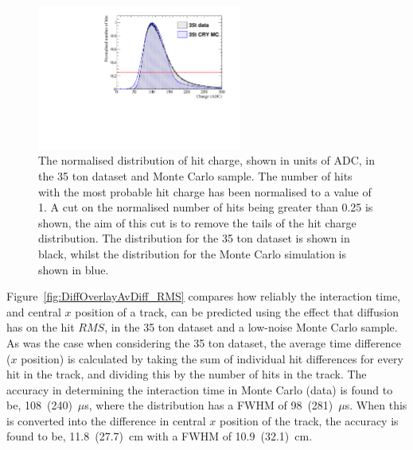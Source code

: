 \begin{figure}
  \centering
  \includegraphics[width=0.6\textwidth]{ChargeCutOverlay}
  \caption[The normalised distribution of hit charge in the 35 ton dataset and a Monte Carlo sample]
          {The normalised distribution of hit charge, shown in units of ADC, in the 35 ton dataset and Monte Carlo sample. The number of hits with the most probable hit charge has been normalised to a value of 1. A cut on the normalised number of hits being greater than 0.25 is shown, the aim of this cut is to remove the tails of the hit charge distribution. The distribution for the 35 ton dataset is shown in black, whilst the distribution for the Monte Carlo simulation is shown in blue.}
  \label{fig:DiffOverlay_ChargeCut}
\end{figure}

Figure~\ref{fig:DiffOverlayAvDiff_RMS} compares how reliably the interaction time, and central $x$ position of a track, can be predicted using the effect that diffusion has on the hit $RMS$, in the 35 ton dataset and a low-noise Monte Carlo sample. As was the case when considering the 35 ton dataset, the average time difference ($x$ position) is calculated by taking the sum of individual hit differences for every hit in the track, and dividing this by the number of hits in the track. The accuracy in determining the interaction time in Monte Carlo (data) is found to be, 108~(240)~$\mu$s, where the distribution has a FWHM of 98~(281)~$\mu$s. When this is converted into the difference in central $x$ position of the track, the accuracy is found to be, 11.8~(27.7)~cm with a FWHM of 10.9~(32.1)~cm. \\

